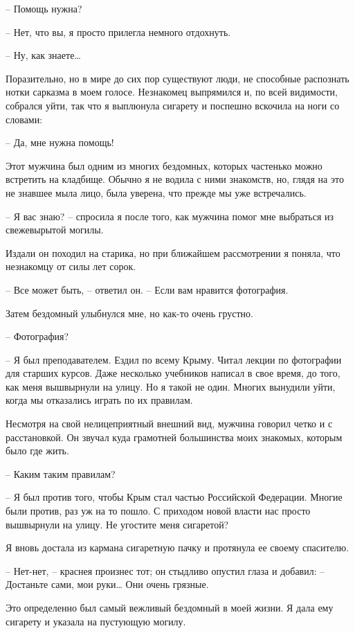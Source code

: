 \documentclass[
]{book}
\begin{document}
-- Помощь нужна?

-- Нет, что вы, я просто прилегла немного отдохнуть.

-- Ну, как знаете\ldots{}

Поразительно, но в мире до сих пор существуют люди, не способные распознать нотки сарказма в моем голосе. Незнакомец выпрямился и, по всей видимости, собрался уйти, так что я выплюнула сигарету и поспешно вскочила на ноги со словами:

-- Да, мне нужна помощь!

Этот мужчина был одним из многих бездомных, которых частенько можно встретить на кладбище. Обычно я не водила с ними знакомств, но, глядя на это не знавшее мыла лицо, была уверена, что прежде мы уже встречались.

-- Я вас знаю? -- спросила я после того, как мужчина помог мне выбраться из свежевырытой могилы.

Издали он походил на старика, но при ближайшем рассмотрении я поняла, что незнакомцу от силы лет сорок.

-- Все может быть, -- ответил он. -- Если вам нравится фотография.

Затем бездомный улыбнулся мне, но как-то очень грустно.

-- Фотография?

-- Я был преподавателем. Ездил по всему Крыму. Читал лекции по фотографии для старших курсов. Даже несколько учебников написал в свое время, до того, как меня вышвырнули на улицу. Но я такой не один. Многих вынудили уйти, когда мы отказались играть по их правилам.

Несмотря на свой нелицеприятный внешний вид, мужчина говорил четко и с расстановкой. Он звучал куда грамотней большинства моих знакомых, которым было где жить.

-- Каким таким правилам?

-- Я был против того, чтобы Крым стал частью Российской Федерации. Многие были против, раз уж на то пошло. С приходом новой власти нас просто вышвырнули на улицу. Не угостите меня сигаретой?

Я вновь достала из кармана сигаретную пачку и протянула ее своему спасителю.

-- Нет-нет, -- краснея произнес тот; он стыдливо опустил глаза и добавил: -- Достаньте сами, мои руки\ldots{} Они очень грязные.

Это определенно был самый вежливый бездомный в моей жизни. Я дала ему сигарету и указала на пустующую могилу.
\end{document}
